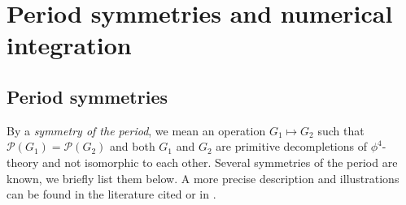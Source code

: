 \documentclass[12pt,a4paper]{article}
\newcommand{\period}{\mathcal P}
\renewcommand{\|}{\rule[-0.4ex]{0.2ex}{1.2em}}
\begin{document}
\FloatBarrier


\section{Period symmetries and numerical integration}\label{sec:symmetries}

	




\subsection{Period symmetries}\label{sec:period_symmetries}


By a \emph{symmetry of the period}, we mean an operation $ G_1 \mapsto G_2$ such that $\period(G_1)=\period(G_2)$ and both $G_1$ and $G_2$ are primitive decompletions of $\phi^4$-theory and not isomorphic to each other.
Several symmetries of the period are known, we briefly list them below. A more precise description and illustrations can be found in the literature cited or in \cite{panzer_hepp_2022}.
\end{document}
